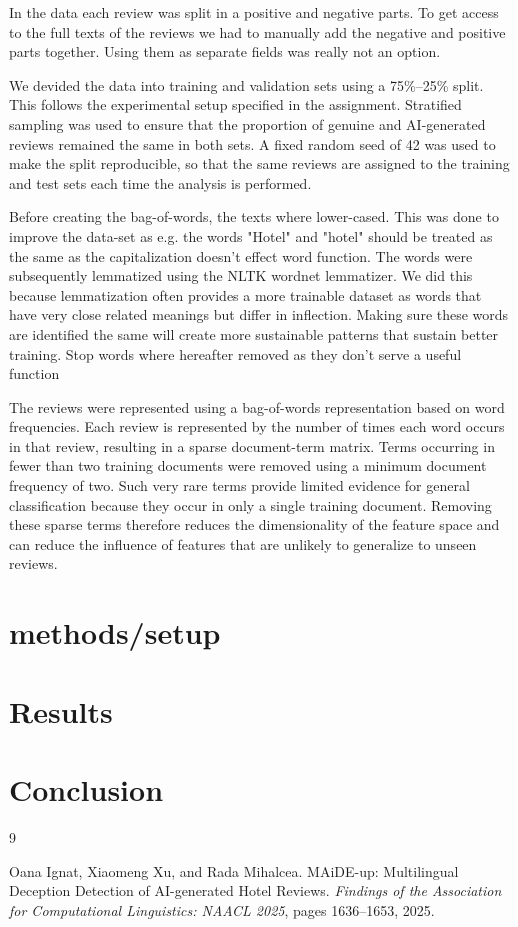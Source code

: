 \documentclass{article}
\begin{document}
In the data each review was split in a positive and negative parts. To get access to the full texts of the reviews we had to manually add the negative and positive parts together. Using them as separate fields was really not an option.

We devided the data into training and validation sets using a 75\%--25\% split. This follows the experimental setup specified in the assignment. Stratified sampling was used to ensure that the proportion of genuine and AI-generated reviews remained the same in both sets. A fixed random seed of 42 was used to make the split reproducible, so that the same reviews are assigned to the training and test sets each time the analysis is performed.

Before creating the bag-of-words, the texts where lower-cased. This was done to improve the data-set as e.g. the words "Hotel" and "hotel" should be treated as the same as the capitalization doesn't effect word function. The words were subsequently lemmatized using the NLTK wordnet lemmatizer. We did this because lemmatization often provides a more trainable dataset as words that have very close related meanings but differ in inflection. Making sure these words are identified the same will create more sustainable patterns that sustain better training. Stop words where hereafter removed as they don't serve a useful function

The reviews were represented using a bag-of-words representation based on word frequencies. Each review is represented by the number of times each word occurs in that review, resulting in a sparse document-term matrix. Terms occurring in fewer than two training documents were removed using a minimum document frequency of two. Such very rare terms provide limited evidence for general classification because they occur in only a single training document. Removing these sparse terms therefore reduces the dimensionality of the feature space and can reduce the influence of features that are unlikely to generalize to unseen reviews.
\section{methods/setup}
\section{Results}
\section{Conclusion}

\begin{thebibliography}{9}

Oana Ignat, Xiaomeng Xu, and Rada Mihalcea.
\newblock MAiDE-up: Multilingual Deception Detection of AI-generated Hotel Reviews.
\newblock \textit{Findings of the Association for Computational Linguistics: NAACL 2025}, pages 1636--1653, 2025.

\end{thebibliography}
\end{document}
